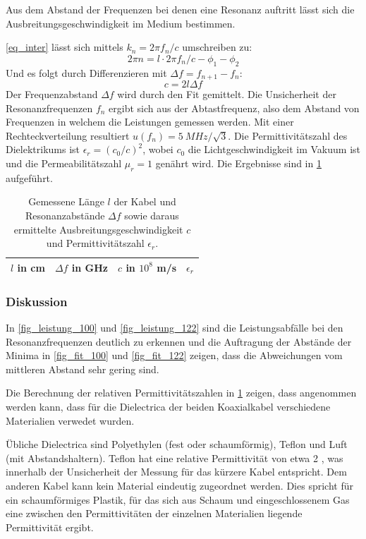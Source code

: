 \documentclass[
	a4paper,
	12pt,
	pagesize,
	ngerman
]{scrartcl}
\begin{document}
	Aus dem Abstand der Frequenzen bei denen eine Resonanz auftritt lässt sich die Ausbreitungsgeschwindigkeit im Medium bestimmen.

	\cref{eq_inter} lässt sich mittels $k_n = 2\pi f_n/c$ umschreiben zu:
	\begin{equation}
		2\pi n = l\cdot2\pi f_n /c -\phi_1 - \phi_2
	\end{equation}
	Und es folgt durch Differenzieren mit $\Delta f = f_{n+1}-f_n$:
	\begin{equation}
	c = 2l\Delta f
	\end{equation}
	Der Frequenzabstand $\Delta f$ wird durch den Fit gemittelt.
	Die Unsicherheit der Resonanzfrequenzen $f_n$ ergibt sich aus der Abtastfrequenz, also dem Abstand von Frequenzen in welchem die Leistungen gemessen werden.
	Mit einer Rechteckverteilung resultiert $u(f_n)= \SI{5}{MHz}/\sqrt{3}$.
	Die Permittivitätszahl des Dielektrikums ist $\epsilon_r=(c_0/c)^2$, wobei $c_0$ die Lichtgeschwindigkeit im Vakuum ist und die Permeabilitätszahl $\mu_r=1$ genährt wird.
	Die Ergebnisse sind in \cref{tb_res} aufgeführt.

\begin{table}[H]
	\centering
	\begin{tabular}{ c | c | c | c }
		 $l$ in \si{cm} & $\Delta f$ in \si{GHz} &  $c$ in $10^8$ \si{m/s} & $\epsilon_r$ \\ \hline
		 
	\end{tabular}
	\caption{
	Gemessene Länge $l$ der Kabel und Resonanzabstände $\Delta f$ sowie daraus ermittelte Ausbreitungsgeschwindigkeit $c$ und Permittivitätszahl $\epsilon_r$.
	}
	\label{tb_res}
\end{table}
	\subsubsection*{Diskussion}

	In \cref{fig_leistung_100} und \cref{fig_leistung_122} sind die Leistungsabfälle bei den Resonanzfrequenzen deutlich zu erkennen und die Auftragung der Abstände der Minima in \cref{fig_fit_100} und \cref{fig_fit_122} zeigen, dass die Abweichungen vom mittleren Abstand sehr gering sind.

	Die Berechnung der relativen Permittivitätszahlen in \cref{tb_res} zeigen, dass angenommen werden kann, dass für die Dielectrica der beiden Koaxialkabel verschiedene Materialien verwedet wurden.

	Übliche Dielectrica sind Polyethylen (fest oder schaumförmig), Teflon und Luft (mit Abstandshaltern).
	Teflon hat eine relative Permittivität von etwa \SI{2}{} \cite{Hippel}, was innerhalb der Unsicherheit der Messung für das kürzere Kabel entspricht.
	Dem anderen Kabel kann kein Material eindeutig zugeordnet werden.
	Dies spricht für ein schaumförmiges Plastik, für das sich aus Schaum und eingeschlossenem Gas eine zwischen den Permittivitäten der einzelnen Materialien liegende Permittivität ergibt.
\end{document}
